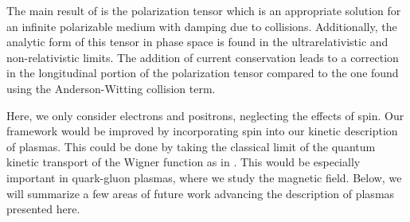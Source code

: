 The main result of \cite{Formanek:2021blc} is the polarization tensor  which is an appropriate solution for an infinite polarizable medium with damping due to collisions. Additionally, the analytic form of this tensor in phase space is found in the ultrarelativistic and non-relativistic limits. The addition of current conservation leads to a correction in the longitudinal portion of the polarization tensor compared to the one found using the Anderson-Witting collision term.

Here, we only consider electrons and positrons, neglecting the effects of spin. Our framework would be improved by incorporating spin into our kinetic description of plasmas. This could be done by taking the classical limit of the quantum kinetic transport of the Wigner function as in \cite{Hurst:2014svf}. This would be especially important in quark-gluon plasmas, where we study the magnetic field. Below, we will summarize a few areas of future work advancing the description of plasmas presented here. 

